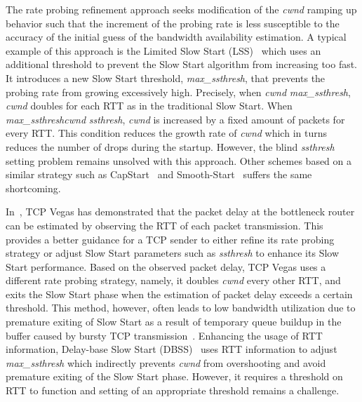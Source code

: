 \documentclass[12pt,onecolumn]{IEEEtran}
\begin{document}
The rate probing refinement approach seeks modification of the \emph{cwnd}
ramping up behavior such that the increment of the probing rate is less
susceptible to the accuracy of the initial guess of the bandwidth availability
estimation. A typical example of this approach is the Limited Slow Start
(LSS)~\cite{limited} which uses an additional threshold to prevent the Slow
Start algorithm from increasing too fast. It introduces a new Slow Start
threshold, \emph{max\_ssthresh}, that prevents the probing rate from growing
excessively high. Precisely, when \emph{cwnd}  \emph{max\_ssthresh},
\emph{cwnd} doubles for each RTT as in the traditional Slow Start. When
\emph{max\_ssthresh}\emph{cwnd}  \emph{ssthresh}, \emph{cwnd} is
increased by a fixed amount of  packets for every RTT. This
condition reduces the growth rate of \emph{cwnd} which in turns reduces the
number of drops during the startup. However, the blind \emph{ssthresh} setting
problem remains unsolved with this approach. Other schemes based on a similar
strategy such as CapStart~\cite{capstart} and Smooth-Start~\cite{smoothstart1,
smoothstart2} suffers the same shortcoming.

In~\cite{vegas}, TCP Vegas has demonstrated that the packet delay at the
bottleneck router can be estimated by observing the RTT of each packet
transmission. This provides a better guidance for a TCP sender to either refine
its rate probing strategy or adjust Slow Start parameters such as
\emph{ssthresh} to enhance its Slow Start performance. Based on the observed
packet delay, TCP Vegas uses a different rate probing strategy, namely, it
doubles \emph{cwnd} every other RTT, and exits the Slow Start phase when the
estimation of packet delay exceeds a certain threshold. This method, however,
often leads to low bandwidth utilization due to premature exiting of Slow Start
as a result of temporary queue buildup in the buffer caused by bursty TCP
transmission~\cite{tcpw-a}. Enhancing the usage of RTT information, Delay-base Slow Start
(DBSS)~\cite{delaybased} uses RTT information to adjust \emph{max\_ssthresh}
which indirectly prevents \emph{cwnd} from overshooting and avoid premature
exiting of the Slow Start phase. However, it requires a threshold on RTT to
function and setting of an appropriate threshold remains a challenge. 
\begin{comment}
\footnote{Delay-base Slow Start (DBSS)~\cite{delaybased} uses observation of
the packet delay to address the \emph{max\_ssthresh} setting problem of LSS.
Specifically, It sets \emph{max\_ssthresh} to \emph{cwnd} when the observed RTT
exceeds a certain RTT threshold. However, the RTT threshold is set with regard
to the maximum RTT of a connection, which is unavailable during the first
startup. Other similar proposals such as Conservative Slow
Start~\cite{conservative} face the same problem as that of DBSS.}
\end{comment}
\end{document}
